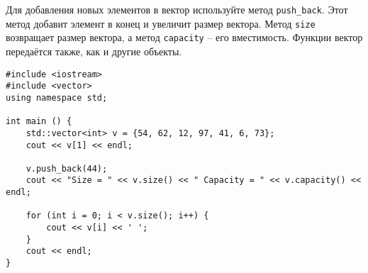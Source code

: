 \documentclass{article}
\begin{document}
Для добавления новых элементов в вектор используйте метод \texttt{push\_back}. Этот метод добавит элемент в конец и увеличит размер вектора. Метод \texttt{size} возвращает размер вектора, а метод \texttt{capacity} -- его вместимость. Функции вектор передаётся также, как и другие объекты.
\begin{lstlisting}
#include <iostream>
#include <vector>
using namespace std;

int main () {
    std::vector<int> v = {54, 62, 12, 97, 41, 6, 73};
    cout << v[1] << endl;
    
    v.push_back(44);
    cout << "Size = " << v.size() << " Capacity = " << v.capacity() << endl;
    
    for (int i = 0; i < v.size(); i++) {
    	cout << v[i] << ' ';
    }
    cout << endl;
}
\end{lstlisting}


      
\end{document}
